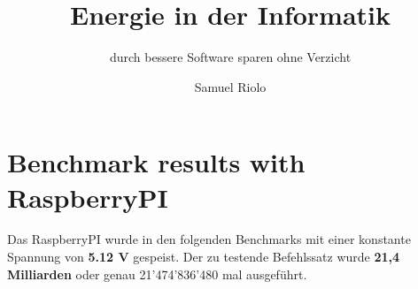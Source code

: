\documentclass{../template/ffhsthesis}
\begin{document}


\title{Energie in der Informatik}
\subtitle{ durch bessere Software sparen ohne Verzicht} %
\author{Samuel Riolo}


\maketitle



\startThesis
\chapter{Benchmark results with RaspberryPI}

Das RaspberryPI wurde in den folgenden Benchmarks mit einer konstante Spannung von \textbf{5.12 V} gespeist. Der zu testende Befehlssatz wurde \textbf{21,4 Milliarden} oder genau 21'474'836'480 mal ausgeführt.

\tikzset{every picture/.style=thick}
\end{document}
